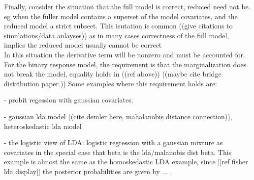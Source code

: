 \documentclass[12pt]{article}
\renewcommand{\P}{P}
\theoremstyle{definition}
\begin{document}
Finally, consider the situation that the full model is correct,
reduced need not be.  eg when the fuller model contains a superset of
the model covariates, and the reduced model a strict subseet. This
isutation is common ((give citations to simulations/data anlayses)) as in many cases correctness of 
the full model,
\[
\]
implies the reduced model usually cannot be correct
\[
\]
In this situation the derivative term will be nonzero and must be
accounted for.
For the binary response model, the requirement is that the marginalization does not break the model,
equality holds in ((ref above)) ((maybe cite bridge distribution
paper.)) Some examples where this requirement holds are:




- probit regession with gaussian covariates.

- gaussian lda model ((cite demler here, mahalanobis distance connection)), heteroskedastic lda model

- the logistic view of LDA: logistic regression with a gaussian mixture as covariates in the special case that beta is the lda/malanobis dist beta. This example is almost the same as the homoskedastic LDA example, since [[ref fisher lda display]] the posterior probabilities are given by ... . 



\end{document}
